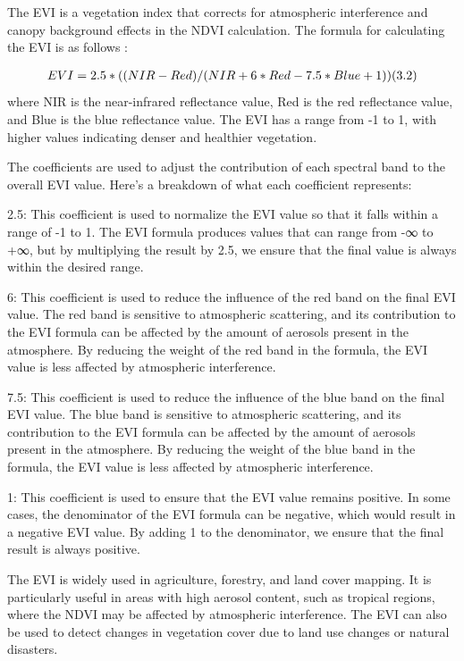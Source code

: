 \documentclass{article}
\begin{document}
{                \hspace{0.5cm}The EVI is a vegetation index that corrects for atmospheric interference and canopy background effects in the NDVI calculation. The formula for calculating the EVI is as follows :\par
                \begin{align*}
                    EVI = 2.5 * ((NIR - Red) / (NIR + 6 * Red - 7.5 * Blue + 1)) \text{\raggedright(3.2)} 
                \end{align*}
                \vspace*{1\baselineskip}
                where NIR is the near-infrared reflectance value, Red is the red reflectance value, and Blue is the blue reflectance value. The EVI has a range from -1 to 1, with higher values indicating denser and healthier vegetation.\par
                The coefficients are used to adjust the contribution of each spectral band to the overall EVI value. Here's a breakdown of what each coefficient represents:\par
                2.5: This coefficient is used to normalize the EVI value so that it falls within a range of -1 to 1. The EVI formula produces values that can range from -∞ to +∞, but by multiplying the result by 2.5, we ensure that the final value is always within the desired range.\par
                6: This coefficient is used to reduce the influence of the red band on the final EVI value. The red band is sensitive to atmospheric scattering, and its contribution to the EVI formula can be affected by the amount of aerosols present in the atmosphere. By reducing the weight of the red band in the formula, the EVI value is less affected by atmospheric interference.\par
                7.5: This coefficient is used to reduce the influence of the blue band on the final EVI value. The blue band is sensitive to atmospheric scattering, and its contribution to the EVI formula can be affected by the amount of aerosols present in the atmosphere. By reducing the weight of the blue band in the formula, the EVI value is less affected by atmospheric interference.\par
                1: This coefficient is used to ensure that the EVI value remains positive. In some cases, the denominator of the EVI formula can be negative, which would result in a negative EVI value. By adding 1 to the denominator, we ensure that the final result is always positive.\par
                The EVI is widely used in agriculture, forestry, and land cover mapping. It is particularly useful in areas with high aerosol content, such as tropical regions, where the NDVI may be affected by atmospheric interference. The EVI can also be used to detect changes in vegetation cover due to land use changes or natural disasters.\par
                \vspace*{1\baselineskip}  
                
}
\end{document}
